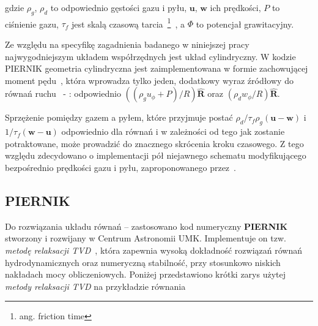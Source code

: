 \noindent gdzie $\rho_g$, $\rho_d$ to odpowiednio gęstości gazu i pyłu,
$\mathbf{u}$, $\mathbf{w}$ ich prędkości, $P$ to ciśnienie gazu, $\tau_f$ jest
skalą czasową tarcia~\footnote{ang. friction time}~, a $\Phi$ to
potencjał grawitacyjny.

\par Ze względu na specyfikę zagadnienia badanego w niniejszej pracy
najwygodniejszym układem współrzędnych jest układ cylindryczny. W kodzie
PIERNIK geometria cylindryczna jest zaimplementowana w formie zachowującej
moment pędu~\cite{M07,SO10}, która wprowadza tylko jeden, dodatkowy wyraz
źródłowy do równań ruchu~ - : odpowiednio
$\left((\rho_g u_\phi + P) / R\right)\mathbf{\hat{R}}$ oraz $(\rho_d w_\phi / R)
\mathbf{\hat{R}}$.
\par Sprzężenie pomiędzy gazem a pyłem, które przyjmuje postać
$\rho_d/\tau_f\rho_g(\mathbf{u}-\mathbf{w})$ i $1/\tau_f(\mathbf{w}-\mathbf{u})$
odpowiednio dla równań  i  w zależności od tego jak zostanie
potraktowane, może prowadzić do znacznego skrócenia kroku czasowego. Z tego
względu zdecydowano o implementacji pół niejawnego schematu modyfikującego
bezpośrednio prędkości gazu i pyłu, zaproponowanego przez~\cite{TB09}.

%

\subsection{PIERNIK}
Do rozwiązania układu równań -- zastosowano kod numeryczny
\textbf{PIERNIK} stworzony i rozwijany w Centrum Astronomii UMK.  Implementuje
on tzw. \textit{metodę relaksacji TVD}~\cite{jin-xin-95}, która zapewnia wysoką
dokładność rozwiązań równań hydrodynamicznych oraz numeryczną stabilność, przy
stosunkowo niskich nakładach mocy obliczeniowych. Poniżej przedstawiono krótki
zarys użytej \textit{metody relaksacji TVD} na przykładzie równania


